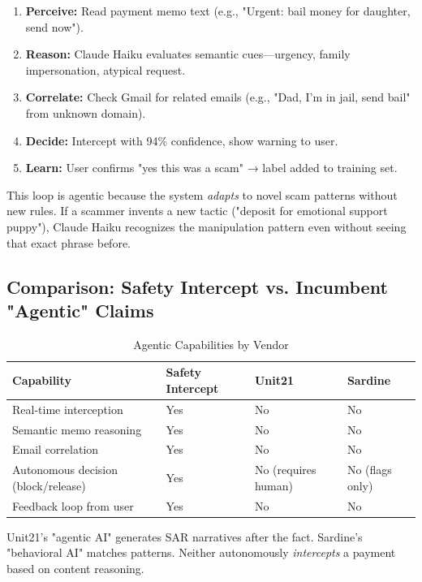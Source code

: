 \documentclass[12pt]{article}
\begin{document}
\begin{enumerate}
    \item \textbf{Perceive:} Read payment memo text (e.g., "Urgent: bail money for daughter, send now").
    \item \textbf{Reason:} Claude Haiku evaluates semantic cues—urgency, family impersonation, atypical request.
    \item \textbf{Correlate:} Check Gmail for related emails (e.g., "Dad, I'm in jail, send bail" from unknown domain).
    \item \textbf{Decide:} Intercept with 94\% confidence, show warning to user.
    \item \textbf{Learn:} User confirms "yes this was a scam" → label added to training set.
\end{enumerate}

This loop is agentic because the system \textit{adapts} to novel scam patterns without new rules. If a scammer invents a new tactic ("deposit for emotional support puppy"), Claude Haiku recognizes the manipulation pattern even without seeing that exact phrase before.

\subsection{Comparison: Safety Intercept vs. Incumbent "Agentic" Claims}

\begin{table}[H]
\centering
\caption{Agentic Capabilities by Vendor}
\begin{tabular}{|l|l|l|l|}
\hline
\textbf{Capability} & \textbf{Safety Intercept} & \textbf{Unit21} & \textbf{Sardine} \\
\hline
Real-time interception & Yes & No & No \\
\hline
Semantic memo reasoning & Yes & No & No \\
\hline
Email correlation & Yes & No & No \\
\hline
Autonomous decision (block/release) & Yes & No (requires human) & No (flags only) \\
\hline
Feedback loop from user & Yes & No & No \\
\hline
\end{tabular}
\end{table}

Unit21's "agentic AI" generates SAR narratives after the fact. Sardine's "behavioral AI" matches patterns. Neither autonomously \textit{intercepts} a payment based on content reasoning.
\end{document}
